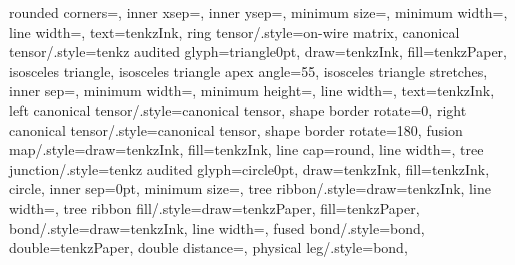 {{      rounded corners=\tenkz@dim{\tenkz@r@wireglyphcap},
      inner xsep=\tenkz@wireglyphxinset,
      inner ysep=\tenkz@wireglyphyinset,
      minimum size=\tenkz@dim{\tenkz@r@wireglyph},
      minimum width=\tenkz@dim{\tenkz@r@glyphref},
      line width=\tenkz@wirewidth, text=tenkzInk},
  ring tensor/.style={on-wire matrix},
  canonical tensor/.style={tenkz audited glyph={triangle}{0pt},
      draw=tenkzInk,
      fill=tenkzPaper,
      isosceles triangle, isosceles triangle apex angle=55,
      isosceles triangle stretches, inner sep=\tenkz@triangleinset,
      minimum width=\tenkz@dim{\tenkz@r@canonicalwidth},
      minimum height=\tenkz@dim{\tenkz@r@wireglyph},
      line width=\tenkz@wirewidth, text=tenkzInk},
  left canonical tensor/.style={canonical tensor, shape border rotate=0},
  right canonical tensor/.style={canonical tensor, shape border rotate=180},
  fusion map/.style={draw=tenkzInk, fill=tenkzInk, line cap=round,
      line width=\tenkz@dim{\tenkz@r@fusionwidth}},
  tree junction/.style={tenkz audited glyph={circle}{0pt}, draw=tenkzInk,
      fill=tenkzInk,
      circle, inner sep=0pt,
      minimum size=\tenkz@junctionfloor},
  tree ribbon/.style={draw=tenkzInk, line width=\tenkz@wirewidth},
  tree ribbon fill/.style={draw=tenkzPaper, fill=tenkzPaper},
  bond/.style={draw=tenkzInk, line width=\tenkz@wirewidth},
  fused bond/.style={bond, double=tenkzPaper,
      double distance=\tenkz@fusedwiregap},
  physical leg/.style={bond},
}
